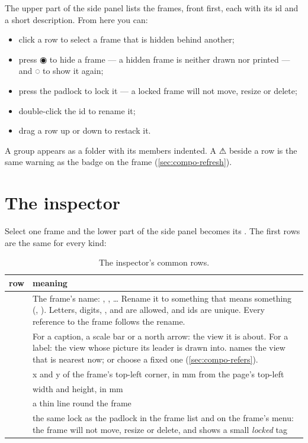 The upper part of the side panel lists the frames, front first, each with its id and a short description. From here you can:

\begin{itemize}
\item click a row to select a frame that is hidden behind another;
\item press ◉ to hide a frame — a hidden frame is neither drawn nor printed — and ◌ to show it again;
\item press the padlock to lock it — a locked frame will not move, resize or delete;
\item double-click the id to rename it;
\item drag a row up or down to restack it.
\end{itemize}

A group appears as a folder with its members indented. A ⚠ beside a row is the same warning as the badge on the frame (\cref{sec:compo-refresh}).

\section{The inspector}\label{sec:compo-inspector}

Select one frame and the lower part of the side panel becomes its . The first rows are the same for every kind:

\begin{table}[htbp]\small
\begin{tabularx}{\linewidth}{@{}lL@{}}\toprule
row & meaning \\ \midrule
{} & The frame's name: , , … Rename it to something that means something (, ). Letters, digits, \code{-}, \code{\_} and  are allowed, and ids are unique. Every reference to the frame follows the rename. \\
 & For a caption, a scale bar or a north arrow: the view it is about. For a label: the view whose picture its leader is drawn into.  names the view that is nearest now; or choose a fixed one (\cref{sec:compo-refers}). \\
 & x and y of the frame's top-left corner, in mm from the page's top-left \\
 & width and height, in mm \\
 & a thin line round the frame \\
 & the same lock as the padlock in the frame list and  on the frame's menu: the frame will not move, resize or delete, and shows a small \emph{locked} tag \\ \bottomrule
\end{tabularx}
\caption{The inspector's common rows.}\label{tab:compo-inspector}
\end{table}

